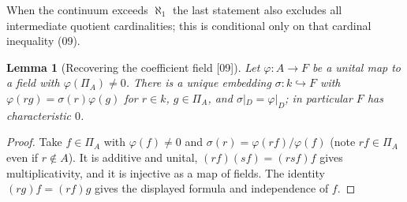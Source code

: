 \documentclass[11pt,letterpaper]{article}
\numberwithin{equation}{section}
\newtheorem{lemma}[lemma]{Lemma}
\theoremstyle{definition}
\theoremstyle{remark}
\theoremstyle{plain}
\newcommand{\src}[1]{\textup{\textsf{[#1]}}}
\begin{document}
When the continuum exceeds $\aleph_1$ the last statement also excludes all intermediate quotient cardinalities;
this is conditional only on that cardinal inequality (09).

\begin{lemma}[Recovering the coefficient field \src{09}]\label{osq:lem:coefffield}
Let $\varphi:A\to F$ be a unital map to a field with $\varphi(\Pi_A)\ne0$. There is a unique embedding
$\sigma:k\hookrightarrow F$ with $\varphi(rg)=\sigma(r)\varphi(g)$ for $r\in k$, $g\in\Pi_A$, and
$\sigma|_D=\varphi|_D$; in particular $F$ has characteristic $0$.
\end{lemma}
\begin{proof}
Take $f\in\Pi_A$ with $\varphi(f)\ne0$ and $\sigma(r)=\varphi(rf)/\varphi(f)$ (note $rf\in\Pi_A$ even if
$r\notin A$). It is additive and unital, $(rf)(sf)=(rsf)f$ gives multiplicativity, and it is injective as a
map of fields. The identity $(rg)f=(rf)g$ gives the displayed formula and independence of $f$.
\end{proof}
\end{document}
